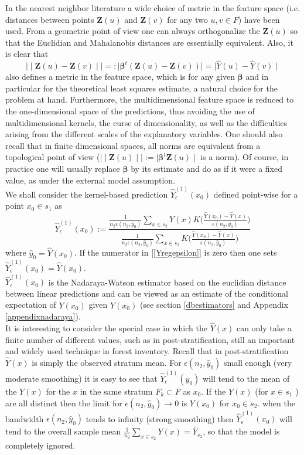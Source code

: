 \documentclass[a4paper,12pt,leqno, titlepage]{article}
\begin{document}
In the nearest neighbor literature a wide choice of metric in the feature space (i.e. distances between points $\pmb{Z}(u)$ and $\pmb{Z}(v)$ for any two $u,v\in{F}$) have been used. From a geometric point of view one can always orthogonalize the $\pmb{Z}(u)$ so that the Euclidian and Mahalanobis distances are essentially equivalent. Also, it is clear that
$$\mid\mid \pmb{Z}(u)-\pmb{Z}(v)\mid \mid=:\mid \pmb{\beta}^t(\pmb{Z}(u)-\pmb{Z}(v))\mid=\mid \hat{Y}(u)-\hat{Y}(v)\mid$$ also defines a metric in the feature space, which is for any given $\pmb{\beta}$ and in particular for the theoretical least squares estimate, a natural choice for the problem at hand. Furthermore, the multidimensional feature space is reduced to the one-dimensional space of the predictions, thus avoiding the use of multidimensional kernels, the curse of dimensionality, as well as the difficulties arising from the different scales of the explanatory variables. One should also recall that in finite dimensional spaces, all norms are equivalent from a topological point of view ($\mid \mid\pmb{Z}(u)\mid \mid:=\mid \pmb{\beta}^t\pmb{Z}(u)\mid$ is a norm). Of course, in practice one will usually replace $\pmb{\beta}$ by its estimate and do as if it were a fixed value, as under the external model assumption. \\
We shall consider the kernel-based prediction $\hat{Y}^{(1)}_{\epsilon}(x_0)$ defined point-wise for a point $x_0\in{s_1}$ as
\begin{equation}\label{Yregepsilon}
\hat{Y}^{(1)}_{\epsilon}(x_0):=\frac{ \frac{1}{n_2\epsilon(n_2,\hat{y}_0)}
\sum_{x\in{s_2}}Y(x)K\big(\frac{\hat{Y}(x_0)-\hat{Y}(x)}{\epsilon(n_2,\hat{y}_0)}\big)}
{\frac{1}{n_2\epsilon(n_2,\hat{y}_0)}\sum_{x\in{s_2}}K\big(\frac{\hat{Y}(x_0)-\hat{Y}(x)}{\epsilon(n_2,\hat{y}_0)}\big)}
\end{equation}
where $\hat{y}_0=\hat{Y}(x_0)$. If the numerator in [\ref{Yregepsilon}] is zero then one sets $\hat{Y}^{(1)}_{\epsilon}(x_0)=\hat{Y}(x_0)$.\\
$\hat{Y}^{(1)}_{\epsilon}(x_0)$ is the Nadaraya-Watson estimator based on the euclidian distance between linear predictions and can be viewed as an estimate of the conditional expectation of $Y(x_0)$ given $\hat{Y}(x_0)$ (see section \ref{dbestimators} and Appendix \ref{appendixnadaraya}).\\
It is interesting to consider the special case in which the $\hat{Y}(x)$ can only take a finite number of different values, such as in post-stratification, still an important and widely used technique in forest inventory. Recall that in post-stratification $\hat{Y}(x)$ is simply the observed stratum mean. For $\epsilon(n_2,\hat{y}_0)$ small enough (very moderate smoothing) it is easy to see that $\hat{Y}^{(1)}_{\epsilon}(\hat{y}_0)$ will tend to the mean of the $Y(x)$ for the $x$ in the same stratum $F_k\subset F$ as $x_0$. If the $\hat{Y}(x)$ (for $x\in{s_1}$ ) are all distinct then the limit for $\epsilon(n_2,\hat{y}_0)\rightarrow 0$ is $Y(x_0)$ for $x_0\in{s_2}$. when the bandwidth $\epsilon(n_2,\hat{y}_0)$ tends to infinity (strong smoothing) then $\hat{Y}^{(1)}_{\epsilon}(x_0)$ will tend to the overall sample mean $\frac{1}{n_2}\sum_{x\in{s_2}}Y(x)=\bar{Y}_{s_2}$, so that the model is completely ignored. \\
\end{document}
